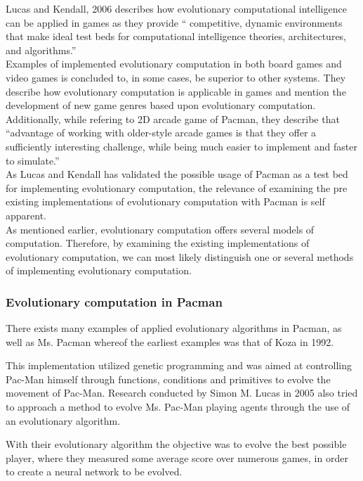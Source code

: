 Lucas and Kendall, 2006 \cite{Lucas2006} describes how evolutionary computational intelligence can be applied in games as they provide  \enquote{ competitive, dynamic
environments that make ideal test beds
for computational intelligence theories,
architectures, and algorithms.}\cite[pp. 10]{Lucas2006}\\
Examples of implemented evolutionary computation in both board games and video games is concluded to, in some cases, be superior to other systems. They describe how evolutionary computation is applicable in games and mention the development of new game genres based upon evolutionary computation. Additionally, while refering to 2D arcade game of Pacman, they describe that \enquote{advantage
of working with older-style arcade games is that they
offer a sufficiently interesting challenge, while being much
easier to implement and faster to simulate.} \cite[pp 15]{Lucas2006} \\

As Lucas and Kendall has validated the possible usage of Pacman as a test bed for implementing evolutionary computation, the relevance of examining the pre existing implementations of evolutionary computation with Pacman is self apparent.\\
As mentioned earlier, evolutionary computation offers several models of computation. Therefore, by examining the existing implementations of evolutionary computation, we can most likely distinguish one or several methods of implementing evolutionary computation.

\subsubsection{Evolutionary computation in Pacman}


There exists many examples of applied evolutionary algorithms in Pacman, as well as Ms. Pacman whereof the earliest examples was that of Koza in 1992.\cite{Koza1992}

This implementation utilized genetic programming and was aimed at controlling Pac-Man himself through functions, conditions and primitives to evolve the movement of Pac-Man. \cite[pp. 2]{Lucas2005}
Research conducted by Simon M. Lucas in 2005 also tried to approach a method to evolve Ms. Pac-Man playing agents through the use of an evolutionary algorithm. \cite{Lucas2005}

With their evolutionary algorithm the objective was to evolve the best possible player, where they measured some average score over numerous games, in order to create a neural network to be evolved. \cite[pp. 8]{Lucas2005}

